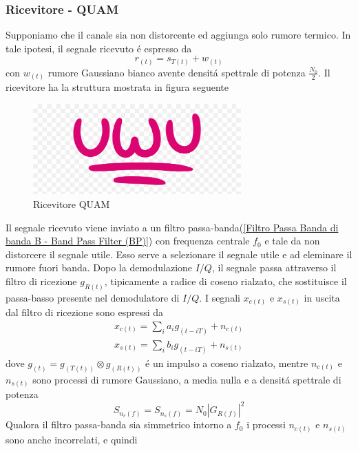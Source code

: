         \subsubsection{Ricevitore - QUAM}
            Supponiamo che il canale sia non distorcente ed aggiunga solo rumore termico. In tale ipotesi, il segnale ricevuto 
            é espresso da
            \[
                r_{(t)} = s_{T(t)}+w_{(t)}    
            \]
            con $w_{(t)}$ rumore Gaussiano bianco avente densitá spettrale di potenza $\frac{N_0}{2}$. Il ricevitore ha la
            struttura mostrata in figura seguente 
            \begin{figure}[H]
                \centering
                \includegraphics*[width = 8cm]{media/uwu.png}
                \caption{Ricevitore QUAM}
            \end{figure}            
            Il segnale ricevuto viene inviato a un filtro passa-banda(\ref{Filtro Passa Banda di banda B - Band Pass Filter (BP)})
            con frequenza centrale $f_0$ e tale da non distorcere il segnale utile. Esso serve a selezionare il segnale utile e ad 
            eleminare il rumore fuori banda. Dopo la demodulazione $I/Q$, il segnale passa attraverso il filtro di ricezione $g_{R(t)}$,
            tipicamente a radice di coseno rialzato, che sostituisce il passa-basso presente nel demodulatore di $I/Q$. I segnali 
            $x_{c(t)}$ e $x_{s(t)}$ in uscita dal filtro di ricezione sono espressi da 
            \begin{gather}
                x_{c(t)} = \sum_{i}a_ig_{(t-iT)}+n_{c(t)}\nonumber \\
                x_{s(t)} = \sum_{i}b_ig_{(t-iT)}+n_{s(t)}\nonumber
            \end{gather}
            dove $g_{(t)} = g_{(T(t))}\otimes g_{(R(t))}$ é un impulso a coseno rialzato, mentre $n_{c(t)}$ e $n_{s(t)}$ sono 
            processi di rumore Gaussiano, a media nulla e a densitá spettrale di potenza
            \[
                S_{n_c(f)} = S_{n_s(f)} = N_0\left|G_{R(f)}\right|^2   
            \]
            Qualora il filtro passa-banda sia simmetrico intorno a $f_0$ i processi $n_{c(t)}$ e $n_{s(t)}$ sono anche incorrelati, e quindi 
